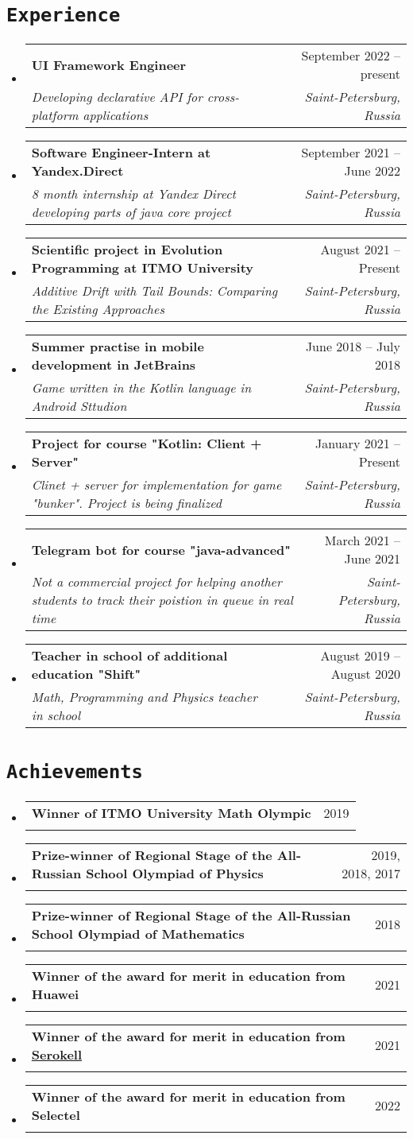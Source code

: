 \documentclass[letterpaper,10pt]{article}
\makeatletter
\newcommand{\apricotColor}[1]{\colorbox{Apricot}{\texttt{#1}}}
\newcommand{\resumeSubheading}[4]{
  \vspace{-2pt}\item
    \begin{tabular*}{0.97\textwidth}[t]{l@{\extracolsep{\fill}}r}
      \textbf{#1} & #2 \\
      \textit{\small#3} & \textit{\small #4} \\
    \end{tabular*}\vspace{-7pt}
}
\newcommand{\resumeSubHeadingListStart}{\begin{itemize}[leftmargin=0.15in, label={}]}
\newcommand{\resumeSubHeadingListEnd}{\end{itemize}}
\makeatother
\begin{document}
\section{\apricotColor{Experience}}
\resumeSubHeadingListStart
        \resumeSubheading
            {UI Framework Engineer}
            {September 2022 -- present}
            {Developing declarative API for cross-platform applications}{Saint-Petersburg, Russia}
  \resumeSubHeadingListEnd
    \resumeSubHeadingListStart
        \resumeSubheading
            {Software Engineer-Intern at Yandex.Direct}{September 2021 -- June 2022}
            {8 month internship at Yandex Direct developing parts of java core project}{Saint-Petersburg, Russia}
  \resumeSubHeadingListEnd
  \resumeSubHeadingListStart
        \resumeSubheading
            {Scientific project in Evolution Programming at ITMO University}{August 2021 -- Present}
            {Additive Drift with Tail Bounds: Comparing the Existing Approaches}{Saint-Petersburg, Russia}
  \resumeSubHeadingListEnd
  \resumeSubHeadingListStart
    \resumeSubheading
      {Summer practise in mobile development in JetBrains}{June 2018 -- July 2018}
      {Game written in the Kotlin language in Android Sttudion}{Saint-Petersburg, Russia}
  \resumeSubHeadingListEnd
  \resumeSubHeadingListStart
    \resumeSubheading
      {Project for course "Kotlin: Client + Server"}{January 2021 -- Present}
      {Clinet + server for implementation for game "bunker". Project is being finalized}{Saint-Petersburg, Russia}
  \resumeSubHeadingListEnd
  \resumeSubHeadingListStart
    \resumeSubheading
      {Telegram bot for course "java-advanced"}{March 2021 -- June 2021}
      {Not a commercial project for helping another students to track their poistion in queue in real time}{Saint-Petersburg, Russia}
  \resumeSubHeadingListEnd
  \resumeSubHeadingListStart
    \resumeSubheading
      {Teacher in school of additional education "Shift"}{August 2019 -- August 2020}
      {Math, Programming and Physics teacher in school}{Saint-Petersburg, Russia}
  \resumeSubHeadingListEnd

  
\section{\apricotColor{Achievements}}
\resumeSubHeadingListStart
  \resumeSubheading
    {Winner of ITMO University Math Olympic}{2019}
    {}{}
    \resumeSubheading
    {Prize-winner of Regional Stage of the All-Russian School Olympiad of Physics}{2019, 2018, 2017}
    {}{}
    \resumeSubheading
    {Prize-winner of Regional Stage of the All-Russian School Olympiad of Mathematics}{2018}
    {}{}
    \resumeSubheading
    {Winner of the award for merit in education from Huawei}{2021}
    {}{}
    \resumeSubheading
    {Winner of the award for merit in education from  \href{serokell.io}{Serokell}}{2021}
    {}{}
    \resumeSubheading
    {Winner of the award for merit in education from Selectel}{2022}
    {}{}
\resumeSubHeadingListEnd
\end{document}
